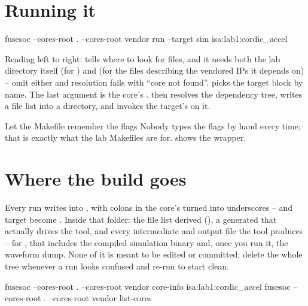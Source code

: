 \section{Running it}

\begin{shcode}
fusesoc --cores-root . --cores-root vendor run --target sim isa:lab1:cordic_accel
\end{shcode}

Reading left to right:  tells \FuseSoC where to
look for  files, and it needs both the lab directory itself
(for ) and  (for the 
files describing the vendored IPs it depends on) -- omit either and
resolution fails with ``core not found''.  picks the
target block by name. The last argument is the core's . \FuseSoC
then resolves the dependency tree, writes a file list into a
 directory, and invokes the target's 
on it.

\begin{tipbox}{Let the Makefile remember the flags}
Nobody types the  flags by hand every time; that is
exactly what the lab Makefiles are for.  shows the
wrapper.
\end{tipbox}

\section{Where the build goes}
\label{sec:fusesoc:builddir}

Every run writes into , with colons
in the core's  turned into underscores -- 
and target  become .
Inside that folder: the file list \FuseSoC derived (), a
generated  that actually drives the tool, and every
intermediate and output file the tool produces -- for ,
that includes the compiled simulation binary and, once you run it, the
waveform dump. None of it is meant to be edited or committed; delete the
whole  tree whenever a run looks confused and re-run
 to start clean.

\begin{shcode}
fusesoc --cores-root . --cores-root vendor core-info isa:lab1:cordic_accel
fusesoc --cores-root . --cores-root vendor list-cores
\end{shcode}

